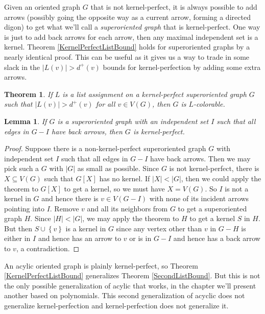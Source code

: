 \documentclass[openany]{tufte-book} %
\theoremstyle{plain}
\newtheorem{lemma}{Lemma}
\newtheorem{theorem}{Theorem}
\newcommand{\set}[1]{\left\{ #1 \right\}}
\newcommand{\card}[1]{\left|#1\right|}
\begin{document}
Given an oriented graph $G$ that is not kernel-perfect, it is always possible to add arrows (possibly going the opposite way as a current arrow, forming a directed digon) 
to get what we'll call a \emph{superoriented graph} that is kernel-perfect.  One way is just to add back arrows for each arrow, then any maximal independent set is a kernel.
Theorem \ref{KernelPerfectListBound} holds for superoriented graphs by a nearly identical proof.  
This can be useful as it gives us a way to trade in some slack in the $\card{L(v)} > d^+(v)$ bounds for kernel-perfection by adding some extra arrows.

\begin{theorem}\label{KernelPerfectSuperListBound}
If $L$ is a list assignment on a kernel-perfect superoriented graph $G$ such that $\card{L(v)} > d^+(v)$ for all $v \in V(G)$, then $G$ is $L$-colorable.
\end{theorem}

\begin{lemma}\label{KostochkaYanceyKernelLemma}
If $G$ is a superoriented graph with an independent set $I$ such that all edges in $G-I$ have back arrows, then $G$ is kernel-perfect.
\end{lemma}
\begin{proof}
Suppose there is a non-kernel-perfect superoriented graph $G$ with independent set $I$ such that all edges in $G-I$ have back arrows.  Then we may pick such a $G$ with $\card{G}$
as small as possible.  Since $G$ is not kernel-perfect, there is $X \subseteq V(G)$ such that $G[X]$ has no kernel.  If $\card{X} < \card{G}$, 
then we could apply the theorem to $G[X]$ to get a kernel, so we must have $X = V(G)$.  So $I$ is not a kernel in $G$ and hence there is $v \in V(G-I)$ 
with none of its incident arrows pointing into $I$.  Remove $v$ and all its neighbors from $G$ to get a superoriented graph $H$. Since $\card{H} < \card{G}$, we may apply the
theorem to $H$ to get a kernel $S$ in $H$.  But then $S \cup \set{v}$ is a kernel in $G$ since any vertex other than $v$ in $G-H$ is either in $I$ and hence 
has an arrow to $v$ or is in $G-I$ and hence has a back arrow to $v$, a contradiction.
\end{proof}

An acylic oriented graph is plainly kernel-perfect, so Theorem \ref{KernelPerfectListBound} generalizes Theorem \ref{SecondListBound}.  
But this is not the only possible generalization of acylic that works, in the  chapter we'll present 
another based on polynomials.
This second generalization of acyclic does not generalize kernel-perfection and kernel-perfection does not generalize it.
\end{document}
